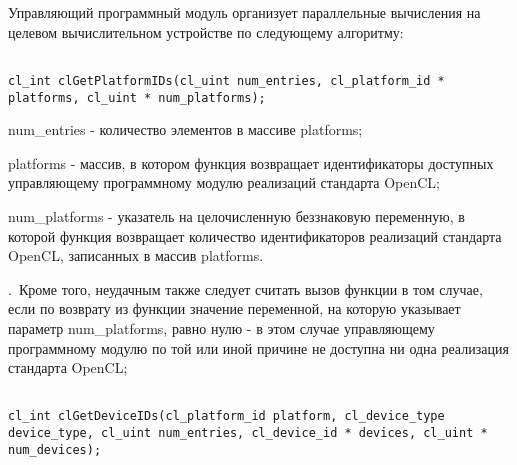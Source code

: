 	Управляющий программный модуль организует параллельные вычисления на целевом вычислительном устройстве по следующему алгоритму:

	\begin{enumerate}



\begin{lstlisting}

cl_int clGetPlatformIDs(cl_uint num_entries, cl_platform_id * platforms, cl_uint * num_platforms);

\end{lstlisting}

		\openclend
		{
			\item num\_entries - количество элементов в массиве platforms;
			\item platforms - массив, в котором функция \openclfunc возвращает идентификаторы доступных управляющему программному модулю реализаций стандарта OpenCL;
			\item num\_platforms - указатель на целочисленную беззнаковую переменную, в которой функция \openclfunc возвращает количество идентификаторов реализаций стандарта OpenCL, записанных в массив platforms.
		}
		{\openclsuccess.~Кроме того, неудачным также следует считать вызов функции \openclfunc в том случае, если по возврату из функции значение переменной, на которую указывает параметр num\_platforms, равно нулю - в этом случае управляющему программному модулю по той или иной причине не доступна ни одна реализация стандарта OpenCL;}



\begin{lstlisting}

cl_int clGetDeviceIDs(cl_platform_id platform, cl_device_type device_type, cl_uint num_entries, cl_device_id * devices, cl_uint * num_devices);

\end{lstlisting}


\end{enumerate}
